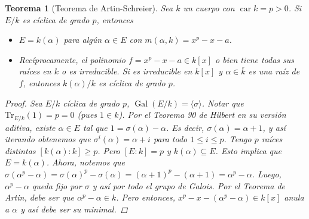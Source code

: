 \documentclass[12pt]{book}
\newtheorem{teo}{Teorema}[section]
\theoremstyle{definition}
\DeclareMathOperator{\car}{car}
\DeclareMathOperator{\Gal}{Gal}
\begin{document}
\begin{teo}[Teorema de Artin-Schreier]
Sea $k$ un cuerpo con $\car k=p>0$. Si $E/k$ es cíclica de grado $p$, entonces \begin{itemize}\item $E=k(\alpha)$ para algún $\alpha\in E$ con $m(\alpha,k)=x^p -x -a$. \item Recíprocamente, el polinomio $f=x^p - x - a\in k[x]$ o bien tiene todas sus raíces en $k$ o es irreducible. Si es irreducible en $k[x]$ y $\alpha\in\overline{k}$ es una raíz de $f$, entonces $k(\alpha)/k$ es cíclica de grado $p$.\end{itemize}
\begin{proof}
Sea $E/k$ cíclica de grado $p$, $\Gal(E/k)=\langle\sigma\rangle$. Notar que $\mathrm{Tr}_{E/k}(1)=p=0$ (pues $1\in k$). Por el Teorema 90 de Hilbert en su versión aditiva, existe $\alpha\in E$ tal que $1=\sigma(\alpha)-\alpha$. Es decir, $\sigma(\alpha)=\alpha+1$, y así iterando obtenemos que $\sigma^i(\alpha)= \alpha+i$ para todo $1\leq i\leq p$. Tengo $p$ raíces distintas $[k(\alpha):k]\geq p$. Pero $[E:k]=p$ y $k(\alpha)\subseteq E$. Esto implica que $E=k(\alpha)$. Ahora, notemos que $\sigma(\alpha^p -\alpha)=\sigma(\alpha)^p - \sigma(\alpha) = (\alpha+1)^p - (\alpha+1) = \alpha^p - \alpha$. Luego, $\alpha^p - \alpha$ queda fijo por $\sigma$ y así por todo el grupo de Galois. Por el Teorema de Artin, debe ser que $\alpha^p -\alpha\in k$. Pero entonces, $x^p - x - (\alpha^p - \alpha)\in k[x]$ anula a $\alpha$ y así debe ser su minimal.


\end{proof}
\end{teo}
\end{document}
